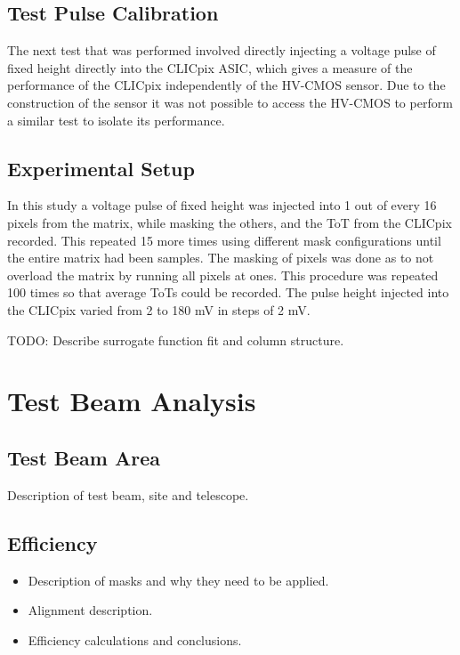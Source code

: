 
\subsection{Test Pulse Calibration}
The next test that was performed involved directly injecting a voltage pulse of fixed height directly into the CLICpix ASIC, which gives a measure of the performance of the CLICpix independently of the HV-CMOS sensor.  Due to the construction of the sensor it was not possible to access the HV-CMOS to perform a similar test to isolate its performance.  

\subsection{Experimental Setup}
In this study a voltage pulse of fixed height was injected into 1 out of every 16 pixels from the matrix, while masking the others, and the ToT from the CLICpix recorded.  This repeated 15 more times using different mask configurations until the entire matrix had been samples.  The masking of pixels was done as to not overload the matrix by running all pixels at ones.  This procedure was repeated 100 times so that average ToTs could be recorded.  The pulse height injected into the CLICpix varied from 2 to 180 mV in steps of 2 mV.



TODO: Describe surrogate function fit and column structure.  


\section{Test Beam Analysis}
\subsection{Test Beam Area}
Description of test beam, site and telescope.

\subsection{Efficiency}

\begin{itemize}
\item Description of masks and why they need to be applied.
\item Alignment description.
\item Efficiency calculations and conclusions. 
\end{itemize}

